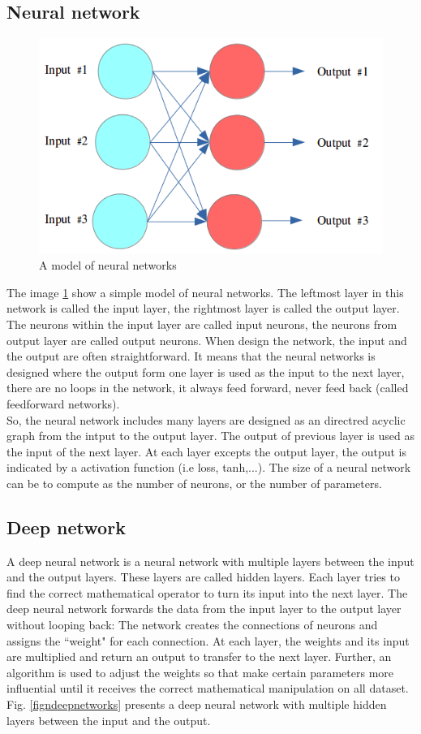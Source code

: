\subsection{Neural network}
\begin{figure}[h]
	\centering
	\includegraphics[scale=0.5]{images/neural_net}
	\caption{A model of neural networks}
	\label{fignnnetworks}
\end{figure}
The image \ref{fignnnetworks} show a simple model of neural networks. The leftmost layer in this network is called the input layer, the rightmost layer is called the output layer. The neurons within the input layer are called input neurons, the neurons from output layer are called output neurons. When design the network, the input and the output are often straightforward. It means that the neural networks is designed where the output form one layer is used as the input to the next layer, there are no loops in the network, it always feed forward, never feed back (called feedforward networks).\\[0.2cm]
So, the neural network includes many layers are designed as an directred acyclic graph from the intput to the output layer. The output of previous layer is used as the input of the next layer. At each layer excepts the output layer, the output is indicated by a activation function (i.e loss, tanh,...). The size of a neural network can be to compute as the number of neurons, or the number of parameters.
\subsection{Deep network}
A deep neural network is a neural network with multiple layers between the input and the output layers. These layers are called hidden layers. Each layer tries to find the correct mathematical operator to turn its input into the next layer. The deep neural network forwards the data from the input layer to the output layer without looping back: The network creates the connections of neurons and assigns the ``weight" for each connection. At each layer, the weights and its input are multiplied and return an output to transfer to the next layer. Further, an algorithm is used to adjust the weights so that make certain parameters more influential until it receives the correct mathematical manipulation on all dataset. Fig. \ref{figndeepnetworks} presents a deep neural network with multiple hidden layers between the input and the output.

